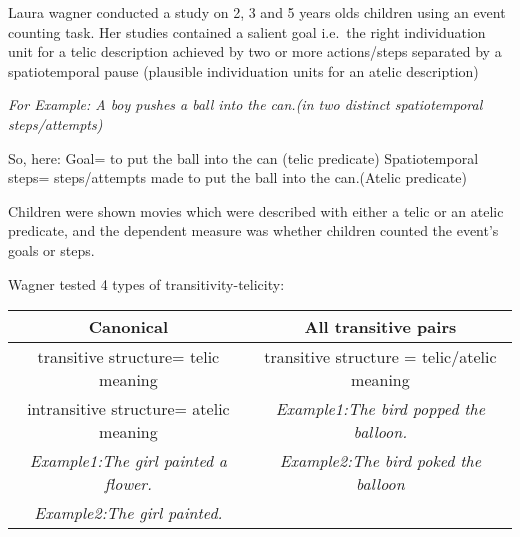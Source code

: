 \documentclass[11pt]{article}
\begin{document}
Laura wagner conducted a study on 2, 3 and 5 years olds children using
an event counting task. Her studies contained a salient goal i.e.~the
right individuation unit for a telic description achieved by two or more
actions/steps separated by a spatiotemporal pause (plausible
individuation units for an atelic description)

\emph{For Example: A boy pushes a ball into the can.(in two distinct
spatiotemporal steps/attempts)}

So, here: Goal= to put the ball into the can (telic predicate)
Spatiotemporal steps= steps/attempts made to put the ball into the
can.(Atelic predicate)

Children were shown movies which were described with either a telic or
an atelic predicate, and the dependent measure was whether children
counted the event's goals or steps.

Wagner tested 4 types of transitivity-telicity:

\begin{longtable}[]{@{}cc@{}}
\toprule
\begin{minipage}[b]{0.37\columnwidth}\centering
Canonical\strut
\end{minipage} & \begin{minipage}[b]{0.57\columnwidth}\centering
All transitive pairs\strut
\end{minipage}\tabularnewline
\midrule
\endhead
\begin{minipage}[t]{0.37\columnwidth}\centering
transitive structure= telic meaning\strut
\end{minipage} & \begin{minipage}[t]{0.57\columnwidth}\centering
transitive structure = telic/atelic meaning\strut
\end{minipage}\tabularnewline
\begin{minipage}[t]{0.37\columnwidth}\centering
intransitive structure= atelic meaning\strut
\end{minipage} & \begin{minipage}[t]{0.57\columnwidth}\centering
\emph{Example1:The bird popped the balloon.}\strut
\end{minipage}\tabularnewline
\begin{minipage}[t]{0.37\columnwidth}\centering
\emph{Example1:The girl painted a flower.}\strut
\end{minipage} & \begin{minipage}[t]{0.57\columnwidth}\centering
\emph{Example2:The bird poked the balloon}\strut
\end{minipage}\tabularnewline
\begin{minipage}[t]{0.37\columnwidth}\centering
\emph{Example2:The girl painted.}\strut
\end{minipage} & \begin{minipage}[t]{0.57\columnwidth}\centering
\strut
\end{minipage}\tabularnewline
\bottomrule
\end{longtable}
\end{document}
